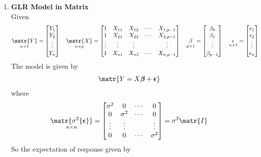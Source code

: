 \documentclass[11pt]{article}
\begin{document}
\begin{enumerate}
    \item \textbf{GLR Model in Matrix} \\
    Given 
    \[
        \underset{n\times 1}{\matr{Y}} = 
        \begin{bmatrix}
            Y_1 \\ Y_2 \\ \vdots \\ Y_n \\ 
        \end{bmatrix}
        \quad 
        \underset{n\times p}{\matr{X}} = 
        \begin{bmatrix}
            1 & X_{11} & X_{12} & \cdots & X_{1, p-1} \\ 
            1 & X_{21} & X_{22} & \cdots & X_{2, p-1} \\ 
            \vdots & \vdots & \vdots & & \vdots \\
            1 & X_{n1} & X_{n2} & \cdots & X_{n, p-1} \\ 
        \end{bmatrix}
        \quad 
        \underset{p\times 1}{\beta} = 
        \begin{bmatrix}
            \beta_0 \\ \beta_1 \\ \vdots \\ \beta_{p-1} \\ 
        \end{bmatrix}
        \quad 
        \underset{n\times 1}{\epsilon} = 
        \begin{bmatrix}
            \epsilon_1 \\ \epsilon_2 \\ \vdots \\ \epsilon_n
        \end{bmatrix}
    \]
    The model is given by 
    \[
        \matr{Y = X\boldsymbol{\beta} + \boldsymbol{\epsilon}}
    \]
    where
    \[
        \underset{n\times n}{\matr{\sigma^2\{\boldsymbol{\epsilon}\}}} = 
        \begin{bmatrix}
            \sigma^2 & 0 & \cdots & 0 \\
            0 & \sigma^2 & \cdots & 0 \\
            \vdots & \vdots & & \vdots \\
            0 & 0 & \cdots & \sigma^2 \\ 
        \end{bmatrix}
        = \sigma^2 \matr{I}
    \]
    So the expectation of response given by 

\end{enumerate}
\end{document}
